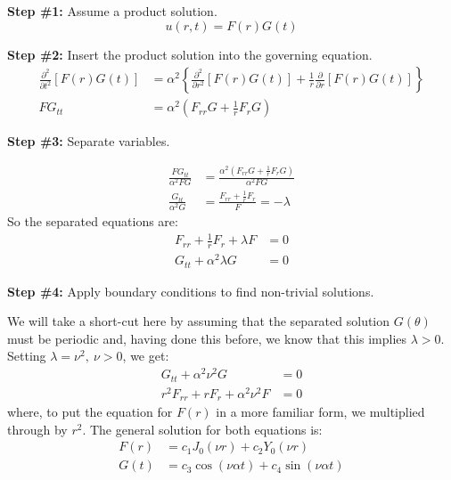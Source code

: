 \vspace{0.25cm}

\noindent\textbf{Step \#1:} Assume a product solution.
\begin{equation*}
u(r,t) = F(r)G(t)
\end{equation*}

\vspace{0.25cm}

\noindent\textbf{Step \#2:} Insert the product solution into the governing equation.
\begin{align*}
\frac{\partial^2 }{\partial t^2}\left[F(r)G(t)\right] &= \alpha^2 \left\{\frac{\partial^2}{\partial r^2}\left[F(r)G(t) \right] + \frac{1}{r}\frac{\partial}{\partial r}\left[F(r)G(t)\right] \right\} \\
FG_{tt} &= \alpha^2 \left(F_{rr}G + \frac{1}{r}F_rG \right)
\end{align*}

\vspace{0.25cm}

\noindent\textbf{Step \#3:} Separate variables.

\begin{align*}
\frac{FG_{tt}}{\alpha^2 FG} &= \frac{\alpha^2 \left(F_{rr}G + \frac{1}{r}F_rG \right)}{\alpha^2 FG} \\
\frac{G_{tt}}{\alpha^2 G} &= \frac{F_{rr} + \frac{1}{r}F_r}{F} = -\lambda
\end{align*}
So the separated equations are:
\begin{align*}
F_{rr} + \frac{1}{r}F_r + \lambda F &= 0 \\
G_{tt} + \alpha^2 \lambda G &= 0
\end{align*}

\vspace{0.25cm}

\noindent\textbf{Step \#4:} Apply boundary conditions to find non-trivial solutions.

\vspace{0.25cm}

\noindent We will take a short-cut here by assuming that the separated solution $G(\theta)$ must be periodic and, having done this before, we know that this implies $\lambda >0$.  Setting $\lambda = \nu^2, \ \nu>0$, we get:
\begin{align*}
G_{tt} + \alpha^2 \nu^2 G &= 0 \\
r^2F_{rr} + rF_r + \alpha^2\nu^2 F &= 0
\end{align*}
where, to put the equation for $F(r)$ in a more familiar form, we multiplied through by $r^2$.  The general solution for both equations is:
\begin{align*}
F(r) &= c_1J_0(\nu r) + c_2 Y_0(\nu r) \\
G(t) &= c_3\cos(\nu \alpha t) + c_4 \sin(\nu \alpha t)
\end{align*}

